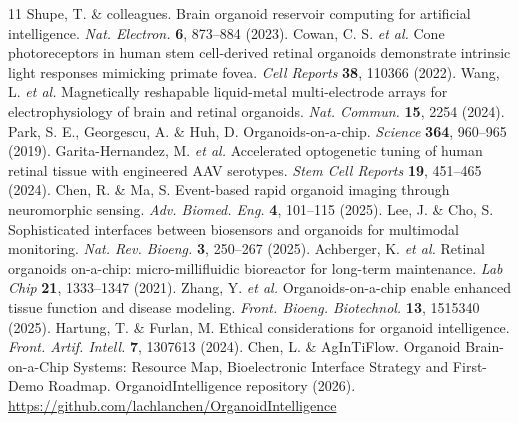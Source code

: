 \documentclass[11pt]{article}
\begin{document}
\begin{thebibliography}{11}
 Shupe, T. \& colleagues. Brain organoid reservoir computing for artificial intelligence. \emph{Nat. Electron.} \textbf{6}, 873--884 (2023).
 Cowan, C. S. \emph{et al.} Cone photoreceptors in human stem cell-derived retinal organoids demonstrate intrinsic light responses mimicking primate fovea. \emph{Cell Reports} \textbf{38}, 110366 (2022).
 Wang, L. \emph{et al.} Magnetically reshapable liquid-metal multi-electrode arrays for electrophysiology of brain and retinal organoids. \emph{Nat. Commun.} \textbf{15}, 2254 (2024).
 Park, S. E., Georgescu, A. \& Huh, D. Organoids-on-a-chip. \emph{Science} \textbf{364}, 960--965 (2019).
 Garita-Hernandez, M. \emph{et al.} Accelerated optogenetic tuning of human retinal tissue with engineered AAV serotypes. \emph{Stem Cell Reports} \textbf{19}, 451--465 (2024).
 Chen, R. \& Ma, S. Event-based rapid organoid imaging through neuromorphic sensing. \emph{Adv. Biomed. Eng.} \textbf{4}, 101--115 (2025).
 Lee, J. \& Cho, S. Sophisticated interfaces between biosensors and organoids for multimodal monitoring. \emph{Nat. Rev. Bioeng.} \textbf{3}, 250--267 (2025).
 Achberger, K. \emph{et al.} Retinal organoids on-a-chip: micro-millifluidic bioreactor for long-term maintenance. \emph{Lab Chip} \textbf{21}, 1333--1347 (2021).
 Zhang, Y. \emph{et al.} Organoids-on-a-chip enable enhanced tissue function and disease modeling. \emph{Front. Bioeng. Biotechnol.} \textbf{13}, 1515340 (2025).
 Hartung, T. \& Furlan, M. Ethical considerations for organoid intelligence. \emph{Front. Artif. Intell.} \textbf{7}, 1307613 (2024).
 Chen, L. \& AgInTiFlow. Organoid Brain-on-a-Chip Systems: Resource Map, Bioelectronic Interface Strategy and First-Demo Roadmap. OrganoidIntelligence repository (2026). \url{https://github.com/lachlanchen/OrganoidIntelligence}
\end{thebibliography}
\end{document}
